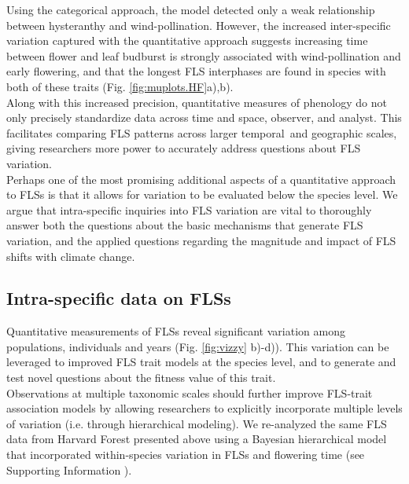 \documentclass[11pt]{article}
\begin{document}
\noindent Using the categorical approach, the model detected only a weak relationship between hysteranthy and wind-pollination. However, the increased inter-specific variation captured with the quantitative approach suggests increasing time between flower and leaf budburst is strongly associated with wind-pollination and early flowering, and that the longest FLS interphases are found in species with both of these traits (Fig. \ref{fig:muplots.HF}a),b).\\

\noindent Along with this increased precision, quantitative measures of phenology \citep[e.g. the BBCH scale,][]{Finn2007} do not only precisely standardize data across time and space, observer, and analyst. This facilitates comparing FLS patterns across larger temporal and geographic scales, giving researchers more power to accurately address questions about FLS variation.\\

\noindent Perhaps one of the most promising additional aspects of a quantitative approach to FLSs is that it allows for variation to be evaluated below the species level. We argue that intra-specific inquiries into FLS variation are vital to thoroughly answer both the questions about the basic mechanisms that generate FLS variation, and the applied questions regarding the magnitude and impact of FLS shifts with climate change.

\subsection*{Intra-specific data on FLSs}
\noindent Quantitative measurements of FLSs reveal significant variation among populations, individuals and years (Fig. \ref{fig:vizzy} b)-d)). This variation can be leveraged to improved FLS trait models at the species level, and to generate and test novel questions about the fitness value of this trait.\\

\noindent Observations at multiple taxonomic scales should further improve FLS-trait association models by allowing researchers to explicitly incorporate multiple levels of variation (i.e. through hierarchical modeling). We re-analyzed the same FLS data from Harvard Forest presented above using a Bayesian hierarchical model that incorporated within-species variation in FLSs and flowering time (see Supporting Information ).\\
\end{document}
